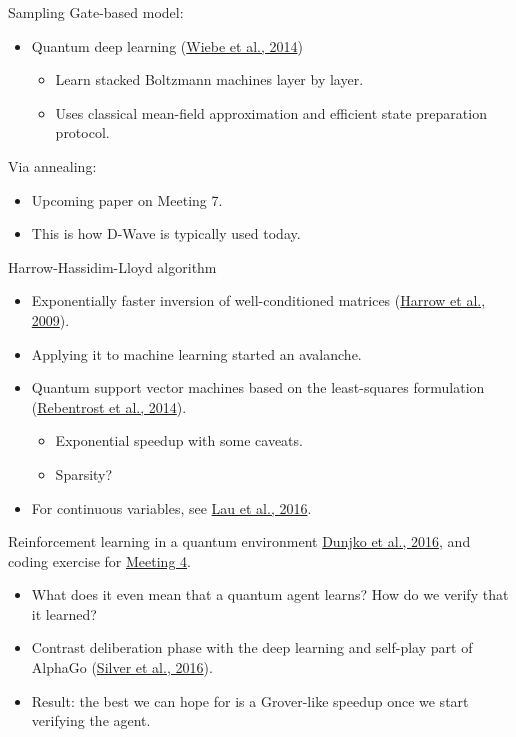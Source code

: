 \documentclass[compress]{beamer}\usetheme{Warsaw}\usecolortheme{crane}\useoutertheme[subsection=false]{smoothbars}
\begin{document}
\begin{frame}{Sampling}
	Gate-based model:
	\begin{itemize}
		\item Quantum deep learning (\href{http://arxiv.org/abs/1412.3489}{Wiebe et al., 2014})
		\begin{itemize}
			\item Learn stacked Boltzmann machines layer by layer.
			\item Uses classical mean-field approximation and efficient state preparation protocol.
		\end{itemize}
	\end{itemize}
	Via annealing:
	\begin{itemize}
		\item Upcoming paper on Meeting 7.
		\item This is how D-Wave is typically used today.
	\end{itemize}
\end{frame}

\begin{frame}{Harrow-Hassidim-Lloyd algorithm}
\begin{itemize}
	\item Exponentially faster inversion of well-conditioned matrices (\href{https://arxiv.org/abs/0811.3171}{Harrow et al., 2009}).
	\item Applying it to machine learning started an avalanche.
	\item Quantum support vector machines based on the least-squares formulation (\href{https://arxiv.org/abs/1307.0471}{Rebentrost et al., 2014}).
	\begin{itemize}
		\item Exponential speedup with some caveats.
		\item Sparsity?
	\end{itemize}
	\item For continuous variables, see \href{http://arxiv.org/abs/1603.06222}{Lau et al., 2016}.
\end{itemize}
\end{frame}

\begin{frame}{Reinforcement learning in a quantum environment}
\href{https://arxiv.org/abs/1610.08251}{Dunjko et al., 2016}, and coding exercise for \href{https://github.com/peterwittek/qml-rg\#meeting-4}{Meeting 4}.
  \begin{itemize}
    \item What does it even mean that a quantum agent learns? How do we verify that it learned?
    \item Contrast deliberation phase with the deep learning and self-play part of AlphaGo (\href{http://doi.org/10.1038/nature16961}{Silver et al., 2016}).
    \item Result: the best we can hope for is a Grover-like speedup once we start verifying the agent.
  \end{itemize}
\end{frame}
\end{document}
